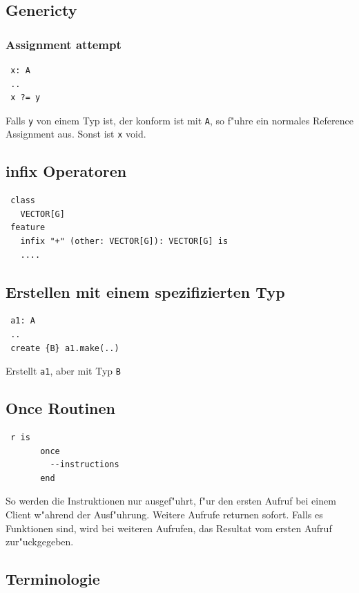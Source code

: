\documentclass[german, 10pt, a4paper, twocolumn]{scrartcl}
\theoremstyle{definition}
\begin{document}
\subsection{Genericty}

\subsubsection{Assignment attempt}

\begin{verbatim}
 x: A
 ..
 x ?= y
\end{verbatim}

Falls \verb#y# von einem Typ ist, der konform ist mit \verb#A#, so f"uhre ein normales Reference Assignment aus. Sonst ist \verb#x# void.

\subsection{infix Operatoren}

\begin{verbatim}
 class
   VECTOR[G]
 feature
   infix "+" (other: VECTOR[G]): VECTOR[G] is
   ....
\end{verbatim}

\subsection{Erstellen mit einem spezifizierten Typ}

\begin{verbatim}
 a1: A
 ..
 create {B} a1.make(..)
\end{verbatim}

Erstellt \verb#a1#, aber mit Typ \verb#B#

\subsection{Once Routinen}

\begin{verbatim}
 r is
       once
         --instructions
       end
\end{verbatim}

So werden die Instruktionen nur ausgef"uhrt, f"ur den ersten Aufruf bei einem Client w"ahrend der Ausf"uhrung. Weitere Aufrufe returnen sofort. Falls es Funktionen sind, wird bei weiteren Aufrufen, das Resultat vom ersten Aufruf zur"uckgegeben.

\subsection{Terminologie}
\end{document}
